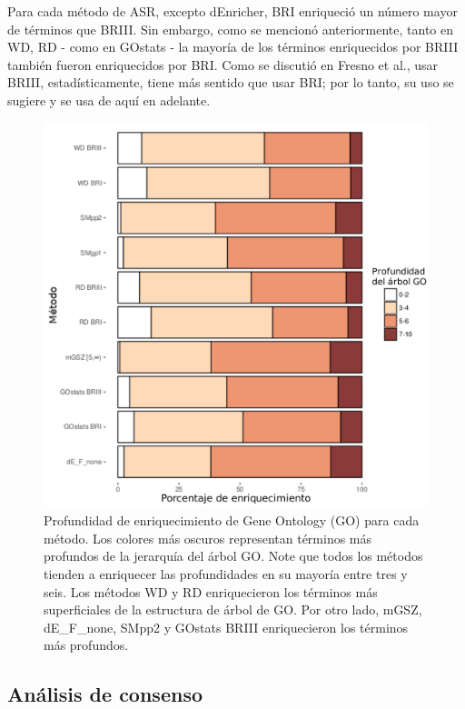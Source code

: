 \documentclass[12pt,twoside]{reedthesis}
\begin{document}
Para cada método de ASR, excepto dEnricher, BRI enriqueció un número mayor de términos que BRIII. Sin embargo, como se mencionó anteriormente, tanto en WD, RD - como en GOstats - la mayoría de los términos enriquecidos por BRIII también fueron enriquecidos por BRI. Como se discutió en Fresno et al., usar BRIII, estadísticamente, tiene más sentido que usar BRI; por lo tanto, su uso se sugiere y se usa de aquí en adelante.
\begin{figure}

{\centering \includegraphics[width=1\linewidth]{images/IFA_FIG2_es} 

}

\caption{Profundidad de enriquecimiento de Gene Ontology (GO) para cada método. Los colores más oscuros representan términos más profundos de la jerarquía del árbol GO. Note que todos los métodos tienden a enriquecer las profundidades en su mayoría entre tres y seis. Los métodos WD y RD enriquecieron los términos más superficiales de la estructura de árbol de GO. Por otro lado, mGSZ, dE\_F\_none, SMpp2 y GOstats BRIII enriquecieron los términos más profundos.}\label{fig:ifa2}
\end{figure}


\hypertarget{sec:consensusSection}{%
\subsection{Análisis de consenso}\label{sec:consensusSection}}
\end{document}
